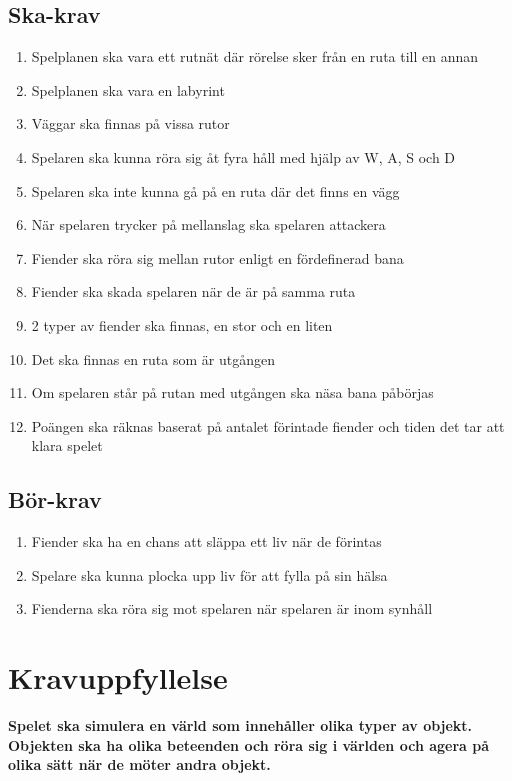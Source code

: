 \documentclass{TDP005mall}
\begin{document}
\subsection{Ska-krav}
\begin{enumerate}
  \item Spelplanen ska vara ett rutnät där rörelse sker från en ruta till en annan
  \item Spelplanen ska vara en labyrint
  \item Väggar ska finnas på vissa rutor
  \item Spelaren ska kunna röra sig åt fyra håll med hjälp av W, A, S och D
  \item Spelaren ska inte kunna gå på en ruta där det finns en vägg
  \item När spelaren trycker på mellanslag ska spelaren attackera
  \item Fiender ska röra sig mellan rutor enligt en fördefinerad bana
  \item Fiender ska skada spelaren när de är på samma ruta
  \item 2 typer av fiender ska finnas, en stor och en liten
  \item Det ska finnas en ruta som är utgången
  \item Om spelaren står på rutan med utgången ska näsa bana påbörjas
  \item Poängen ska räknas baserat på antalet förintade fiender och tiden det tar att klara spelet
\end{enumerate}

\subsection{Bör-krav}
\begin{enumerate}
  \item Fiender ska ha en chans att släppa ett liv när de förintas
  \item Spelare ska kunna plocka upp liv för att fylla på sin hälsa
  \item Fienderna ska röra sig mot spelaren när spelaren är inom synhåll
\end{enumerate}

\newpage
\section{Kravuppfyllelse}


\textbf{Spelet ska simulera en värld som innehåller olika typer av objekt. Objekten ska ha olika beteenden och röra sig i världen och agera på olika sätt när de möter andra objekt.}
\end{document}
